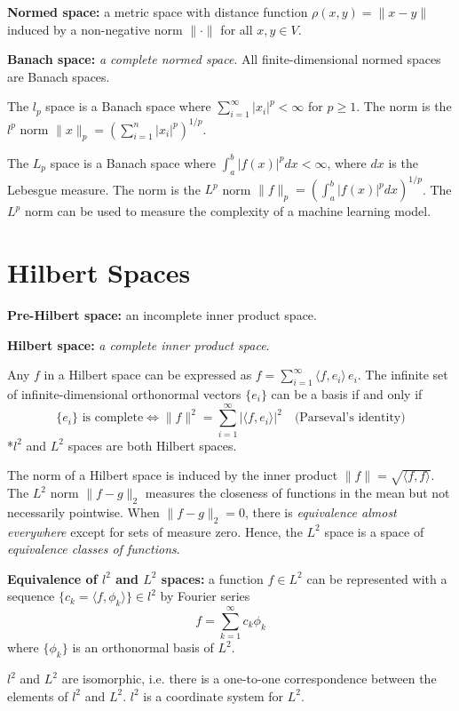\documentclass[12pt]{article}
\begin{document}
\textbf{Normed space:} a metric space with distance function $\rho(x,y) = \|x - y\|$ induced by a non-negative norm $\|\cdot\|$ for all $x, y \in V$.

\textbf{Banach space:} \textit{a complete normed space}. All finite-dimensional normed spaces are Banach spaces.

The $l_p$ space is a Banach space where $\sum_{i=1}^\infty |x_i|^p < \infty$ for $p \geq 1$. The norm is the $l^p$ norm $\|x\|_p = \left( \sum_{i=1}^n |x_i|^p \right)^{1/p}$.

The $L_p$ space is a Banach space where $\int_a^b |f(x)|^p dx < \infty$, where $dx$ is the Lebesgue measure. The norm is the $L^p$ norm $\|f\|_p = \left( \int_a^b |f(x)|^p dx \right)^{1/p}$.
The $L^p$ norm can be used to measure the complexity of a machine learning model.

\section{Hilbert Spaces}
\textbf{Pre-Hilbert space:} an incomplete inner product space.

\textbf{Hilbert space:} \textit{a complete inner product space}. 

Any $f$ in a Hilbert space can be expressed as $f = \sum_{i=1}^\infty \langle f, e_i \rangle \, e_i$. The infinite set of infinite-dimensional orthonormal vectors $\{e_i\}$ can be a basis if and only if 
$$
\{e_i\} \text{ is complete} \iff \|f\|^2 = \sum_{i=1}^\infty |\langle f, e_i \rangle|^2 \quad \text{(Parseval's identity)}
$$
*$l^2$ and $L^2$ spaces are both Hilbert spaces.

The norm of a Hilbert space is induced by the inner product $\|f\| = \sqrt{\langle f, f \rangle}$. The $L^2$ norm $\|f - g\|_2$ measures the closeness of functions in the mean but not necessarily pointwise. When $\|f - g\|_2 = 0$, there is \textit{equivalence almost everywhere} except for sets of measure zero. Hence, the $L^2$ space is a space of \textit{equivalence classes of functions}.

\textbf{Equivalence of $l^2$ and $L^2$ spaces:} a function $f \in L^2$ can be represented with a sequence $\{c_k = \langle f, \phi_k \rangle\} \in l^2$ by Fourier series
$$
f = \sum_{k=1}^\infty c_k \phi_k
$$
where $\{\phi_k\}$ is an orthonormal basis of $L^2$. 

$l^2$ and $L^2$ are isomorphic, i.e. there is a one-to-one correspondence between the elements of $l^2$ and $L^2$. $l^2$ is a coordinate system for $L^2$.
\end{document}
